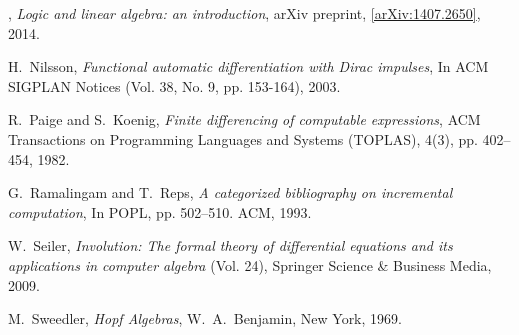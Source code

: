 \documentclass[english,letter paper,12pt,reqno]{article}
\theoremstyle{example}
\begin{document}
\begin{thebibliography}{BHLS03}
\bysame, \textsl{Logic and linear algebra: an introduction}, arXiv preprint, \href{https://arxiv.org/abs/1407.2650}{[arXiv:1407.2650]}, 2014.

H.~Nilsson, \textsl{Functional automatic differentiation with {D}irac impulses}, In ACM SIGPLAN Notices (Vol. 38, No. 9, pp. 153-164), 2003.

R.~Paige and S.~Koenig, \textsl{Finite differencing of computable expressions}, ACM Transactions on Programming Languages and Systems (TOPLAS), 4(3), pp. 402--454, 1982.

G.~Ramalingam and T.~Reps, \textsl{A categorized bibliography on incremental computation}, In POPL, pp. 502--510. ACM, 1993.

W.~Seiler, \textsl{Involution: The formal theory of differential equations and its applications in computer algebra} (Vol. 24), Springer Science \& Business Media, 2009.

M.~Sweedler, \textsl{Hopf Algebras}, W.~A.~Benjamin, New York, 1969.
  
\end{thebibliography}
\end{document}
